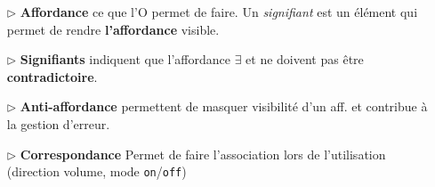 \documentclass[2pt]{report}
\begin{document}
\begin{multicols*}{3}
    \begin{itemize}
        \item[$\rhd$]  \textbf{Affordance} ce que l'O permet de faire.  
            Un \textit{signifiant} est un élément qui permet de rendre 
            \textbf{l'affordance} visible.   
        \item[$\rhd$]  \textbf{Signifiants} indiquent que l'affordance 
            $\exists$ et ne doivent pas être \textbf{contradictoire}.   

        \item[$\rhd$]  \textbf{Anti-affordance} permettent de masquer 
            visibilité d'un aff. et contribue à la gestion d'erreur. 

        \item[$\rhd$]   \textbf{Correspondance} Permet de faire 
            l'association lors de l'utilisation 
            (direction volume, mode \texttt{on}/\texttt{off})
    \end{itemize} 



    \end{multicols*}
\end{document}
